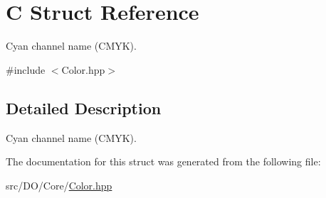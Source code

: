 \hypertarget{struct_d_o_1_1_c}{\section{C Struct Reference}
\label{struct_d_o_1_1_c}
}


Cyan channel name (C\-M\-Y\-K).  




{\ttfamily \#include $<$Color.\-hpp$>$}



\subsection{Detailed Description}
Cyan channel name (C\-M\-Y\-K). 

The documentation for this struct was generated from the following file\-:\begin{DoxyCompactItemize}
\item 
src/\-D\-O/\-Core/\hyperlink{_color_8hpp}{Color.\-hpp}\end{DoxyCompactItemize}
